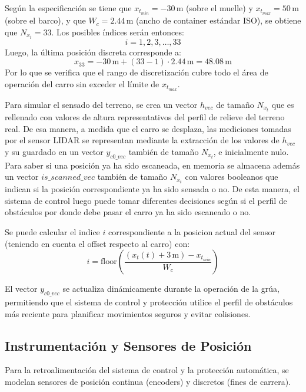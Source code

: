 \documentclass[11pt]{article}                                    %
\begin{document}
Según la especificación se tiene que $x_{t_{min}}=-30\,$m (sobre el muelle) y $x_{t_{max}}=50\,$m (sobre el barco), y que $W_c=2.44\,$m (ancho de container estándar ISO), se obtiene que $N_{x_t} = 33$. Los posibles índices serán entonces:
\begin{equation}
    i = 1, 2, 3, \ldots, 33
\end{equation}
Luego, la última posición discreta corresponde a:
\begin{equation}
    x_{33} = -30\,\text{m} + (33-1) \cdot 2.44\,\text{m} = 48.08\,\text{m}
\end{equation}
Por lo que se verifica que el rango de discretización cubre todo el área de operación del carro sin exceder el límite de $x_{t_{max}}$.

Para simular el sensado del terreno, se crea un vector $h_{vec}$ de tamaño $N_{x_t}$ que es rellenado con valores de altura representativos del perfil de relieve del terreno real. De esa manera, a medida que el carro se desplaza, las mediciones tomadas por el sensor LIDAR se representan mediante la extracción de los valores de $h_{vec}$ y su guardado en un vector $y_{c0\_vec}$ también de tamaño $N_{x_t}$, e inicialmente nulo. Para saber si una posición ya ha sido escaneada, en memoria se almacena además un vector $is\_scanned\_vec$ también de tamaño $N_{x_t}$ con valores booleanos que indican si la posición correspondiente ya ha sido sensada o no. De esta manera, el sistema de control luego puede tomar diferentes decisiones según si el perfil de obstáculos por donde debe pasar el carro ya ha sido escaneado o no.

Se puede calcular el indice $i$ correspondiente a la posicion actual del sensor (teniendo en cuenta el offset respecto al carro) con:
\begin{equation}
    i = \text{floor}\left( \frac{(x_t(t)+3\,\text{m}) - x_{t_{min}}}{W_c} \right)
\end{equation}

El vector $y_{c0\_vec}$ se actualiza dinámicamente durante la operación de la grúa, permitiendo que el sistema de control y protección utilice el perfil de obstáculos más reciente para planificar movimientos seguros y evitar colisiones.

\subsection{Instrumentación y Sensores de Posición}
Para la retroalimentación del sistema de control y la protección automática, se modelan sensores de posición continua (encoders) y discretos (fines de carrera).
\end{document}
